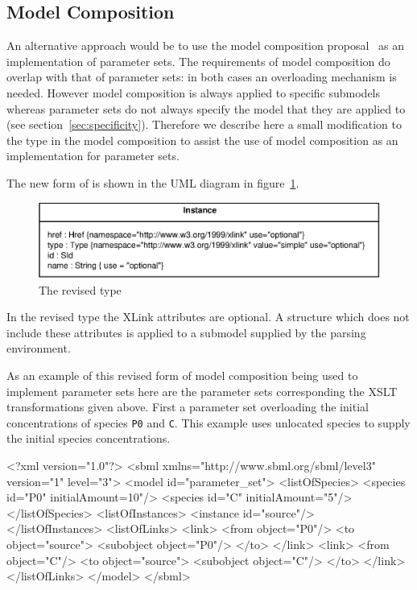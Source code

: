 \documentclass[10pt,twocolumntoc]{cekarticle}
\begin{document}
\subsection{Model Composition}

An alternative approach would be to use the model composition proposal~\citep{finney:2003b}
as an implementation of parameter sets.  The requirements of model composition do overlap with that
of parameter sets: in both cases an overloading mechanism is needed.  However model composition is
always applied to specific submodels whereas parameter sets do not always specify the model that they
are applied to (see section~\ref{sec:specificity}).  Therefore we describe here a small modification to
the  type in the model composition to assist the use of model composition as an
implementation for parameter sets.

The new form of  is shown in the UML diagram in figure~\ref{fig:instance}.

\begin{figure}[h]
  \vspace*{8pt}
  \centering
  \includegraphics[scale = 0.7]{instance}
  \caption{The revised  type}
  \label{fig:instance}
\end{figure}

In the revised type the XLink attributes are optional.  A  structure which does not
include these attributes is applied to a submodel supplied by the parsing environment.

As an example of this revised form of model composition being used to implement parameter sets
here are the parameter sets corresponding the XSLT transformations given above.
First a parameter set overloading the initial concentrations of species \texttt{P0} and \texttt{C}.
This example uses unlocated species to supply the initial species concentrations.

\begin{example}
<?xml version="1.0"?>
<sbml xmlns="http://www.sbml.org/sbml/level3" version="1" level="3">
    <model id="parameter_set">
        <listOfSpecies>
            <species id="P0" initialAmount=10"/>
            <species id="C" initialAmount="5"/>
        </listOfSpecies>
        <listOfInstances>
            <instance id="source"/>
        </listOfInstances>
        <listOfLinks>
            <link>
                <from object="P0"/>
                <to object="source">
                    <subobject object="P0"/>
                </to>
            </link>
            <link>
                <from object="C"/>
                <to object="source">
                    <subobject object="C"/>
                </to>
            </link>
        </listOfLinks>
    </model>
</sbml>
\end{example}
\end{document}
